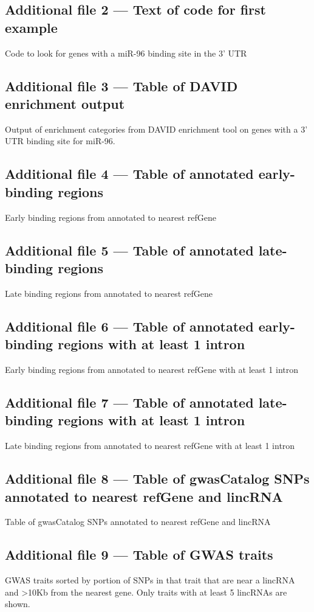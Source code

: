 \documentclass[10pt]{bmc_article}
\newenvironment{bmcformat}{\baselineskip20pt\sloppy\setboolean{publ}{false}}{\baselineskip20pt\sloppy}
\begin{document}
\begin{bmcformat}
  \subsection*{Additional file 2 --- Text of code for first example}
  Code to look for genes with a miR-96 binding site in the 3' UTR

  \subsection*{Additional file 3 --- Table of DAVID enrichment output }
  Output of enrichment categories from DAVID enrichment tool on genes with
  a 3' UTR binding site for miR-96.

  \subsection*{Additional file 4 --- Table of annotated early-binding regions}
  Early binding regions from \cite{Hansen} annotated to nearest refGene

  \subsection*{Additional file 5 --- Table of annotated late-binding regions}
  Late binding regions from \cite{Hansen} annotated to nearest refGene

  \subsection*{Additional file 6 --- Table of annotated early-binding regions with at least 1 intron}
  Early binding regions from \cite{Hansen} annotated to nearest refGene with at least 1 intron

  \subsection*{Additional file 7 --- Table of annotated late-binding regions with at least 1 intron}
  Late binding regions from \cite{Hansen} annotated to nearest refGene with at least 1 intron

  \subsection*{Additional file 8 --- Table of gwasCatalog SNPs annotated to nearest refGene and lincRNA}
  Table of gwasCatalog SNPs annotated to nearest refGene and lincRNA

  \subsection*{Additional file 9 --- Table of GWAS traits}
  GWAS traits sorted by portion of SNPs in that trait that are near a lincRNA and \textgreater 10Kb from the nearest
  gene. Only traits with at least 5 lincRNAs are shown.


\end{bmcformat}
\end{document}
